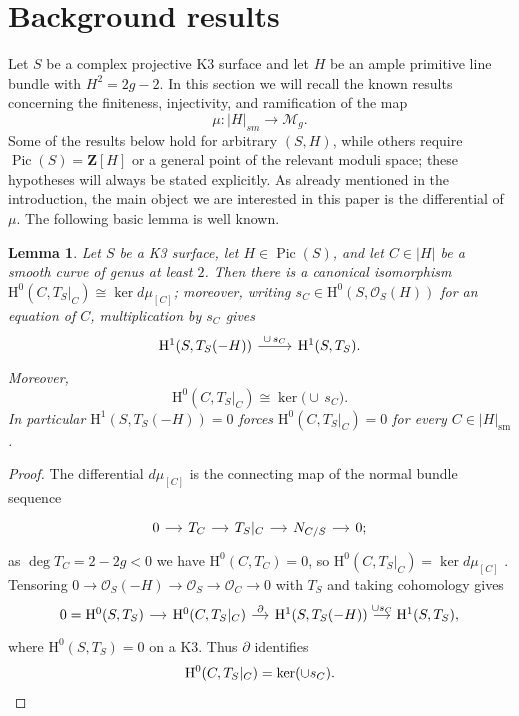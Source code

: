 \documentclass[a4paper,12pt,twoside,reqno]{amsart}
\numberwithin{equation}{section}
\theoremstyle{plain}
\newtheorem{lemma}[theorem]{Lemma}
\theoremstyle{definition}
\DeclareMathOperator{\Pic}{Pic}
\newcommand{\ZZ}{\mathbf{Z}}
\newcommand{\Oc}{\mathscr{O}}
\newcommand{\sm}{\mathrm{sm}}
\newcommand{\Mmod}{\mathscr{M}}
\newcommand{\HH}{\mathrm{H}}
\theoremstyle{plain}
\theoremstyle{definition}
\begin{document}
\section{Background results}\label{sec:high-degree}


Let $S$ be a complex projective K3 surface and let $H$ be an ample
primitive line bundle with $H^2=2g-2$.  In this section we will recall the known results concerning the finiteness, injectivity, and ramification of the map
\[
\mu\colon |H|_{sm} \rightarrow \Mmod_g.
\] Some of the results below hold
for arbitrary $(S,H)$, while others require $\Pic(S)=\ZZ[H]$ or a
general point of the relevant moduli space; these hypotheses will
always be stated explicitly. 
As already mentioned in the introduction, the main object we are interested in this paper is the differential of $\mu$. The following basic lemma is  well known.


\begin{lemma}\label{lem:kernel}
Let $S$ be a K3 surface, let $H\in\Pic(S)$, and let $C\in|H|$ be a
smooth curve of genus at least $2$. Then there is a canonical
isomorphism $\HH^0(C,T_S|_C)\cong\ker d\mu_{[C]}$; moreover, writing
$s_C\in \HH^0(S,\Oc_S(H))$ for an equation of $C$, multiplication by $s_C$ gives
\[
\begin{tikzcd}
\HH^1(S,T_S(-H)) \arrow[r, "\cup\,s_C"]
& \HH^1(S,T_S).
\end{tikzcd}
\]
Moreover,
\[
\HH^0(C,T_S|_C)\cong
\ker\bigl(\cup\,s_C\bigr).
\]
In particular $\HH^1(S,T_S(-H))=0$ forces $\HH^0(C,T_S|_C)=0$ for every $C\in|H|_{\sm}$.
\end{lemma}

\begin{proof}
The differential $d\mu_{[C]}$ is the connecting map of the normal bundle sequence
\[
\begin{tikzcd}[column sep=small]
0 \arrow[r] & T_C \arrow[r] & T_S|_C \arrow[r] & N_{C/S} \arrow[r] & 0;
\end{tikzcd}
\]
as $\deg T_C=2-2g<0$ we have $\HH^0(C,T_C)=0$, so $\HH^0(C,T_S|_C)=\ker d\mu_{[C]}$ \cite[Lemma~3.1]{DH}. Tensoring $0\to\Oc_S(-H)\to\Oc_S\to\Oc_C\to0$ with $T_S$ and taking cohomology gives
\[
\begin{tikzcd}[column sep=small]
0=\HH^0(S,T_S) \arrow[r]
& \HH^0(C,T_S|_C) \arrow[r, "\partial"]
& \HH^1(S,T_S(-H)) \arrow[r, "\cup s_C"]
& \HH^1(S,T_S),
\end{tikzcd}
\]
where $\HH^0(S,T_S)=0$ on a K3. Thus $\partial$ identifies
\[
   \HH^0(C,T_S|_C) = \ker(\cup s_C).\qedhere
\]
\end{proof}
\end{document}
